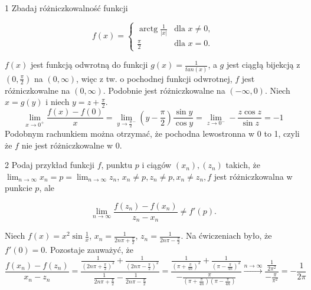 \documentclass{../note}
\begin{document}
\begin{zadanie}{1}
    Zbadaj różniczkowalność funkcji

$$f(x) = \begin{cases} \operatorname{arctg} \frac{1}{|x|} & \text{dla } x \neq 0, \\ \frac{\pi}{2} & \text{dla } x = 0. \end{cases}$$
\end{zadanie}
\begin{rozwiazanie}
$f(x)$ jest funkcją odwrotną do funkcji $g(x) = \frac{1}{tan(x)}$, a $g$ jest ciągłą bijekcją z $(0, \frac{\pi}{2})$ na $(0, \infty)$, więc z tw. o pochodnej funkcji odwrotnej, $f$ jest różniczkowalne na $(0, \infty)$. Podobnie jest różniczkowalne na $(-\infty, 0)$. Niech $x = g(y)$ i niech $y = z + \frac{\pi}{2}$.
\[\lim_{x\to0^+} \frac{f(x) - f(0)}{x} = \lim_{y\to {\frac{\pi}{2}}^-} \left(y - \frac{\pi}{2}\right) \frac{\sin y}{\cos y} = \lim_{z\to0^-} -\frac{z\cos z}{\sin z} = -1\]
Podobnym rachunkiem można otrzymać, że pochodna lewostronna w 0 to 1, czyli że $f$ nie jest różniczkowalne w 0.
\end{rozwiazanie}

\begin{zadanie}{2}
Podaj przykład funkcji $f$, punktu $p$ i ciągów $(x_n), (z_n)$ takich, że $\lim_{n\to\infty} x_n = p = \lim_{n\to\infty} z_n$, $x_n \neq p, z_n \neq p, x_n \neq z_n, f$ jest różniczkowalna w punkcie $p$, ale

$$\lim_{n\to\infty} \frac{f(z_n) - f(x_n)}{z_n - x_n} \neq f'(p).$$
\end{zadanie}
\begin{rozwiazanie}
Niech $f(x) = x^2\sin\frac1x$, $x_n = \frac{1}{2n\pi + \frac\pi2}$, $z_n = \frac{1}{2n\pi - \frac\pi2}$. Na ćwiczeniach było, że $f'(0) = 0$. Pozostaje zauważyć, że
\[\frac{f(x_n) - f(z_n)}{x_n - z_n} = \frac{\frac{1}{\left(2n\pi + \frac\pi2\right)^2} + \frac{1}{\left(2n\pi - \frac\pi2\right)^2}}{\frac{1}{2n\pi + \frac\pi2} - \frac{1}{2n\pi - \frac\pi2}} = \frac{\frac{1}{\left(\pi + \frac{\pi}{4n}\right)^2} + \frac{1}{\left(\pi - \frac{\pi}{4n}\right)^2}}{-\frac{\pi}{\left(\pi + \frac{\pi}{4n}\right)\left(\pi - \frac{\pi}{4n}\right)}} \xrightarrow{n\to\infty} \frac{\frac{1}{2\pi^2}}{-\frac{\pi}{\pi^2}} = -\frac{1}{2\pi}\]
\end{rozwiazanie}
\end{document}
